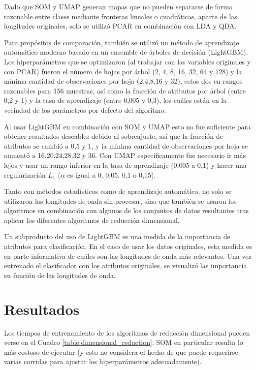 \documentclass[12pt]{article}
\begin{document}
Dado que SOM y UMAP generan mapas que no pueden separarse de forma razonable entre clases mediante fronteras lineales o cuadráticas, aparte de las longitudes originales, solo se utilizó PCAR en combinación con LDA y QDA.

Para propósitos de comparación, también se utilizó un método de aprendizaje automático moderno basado en un ensemble de árboles de decisión (LightGBM). Los hiperparámetros que se optimizaron (al trabajar con las variables originales y con PCAR) fueron el número de hojas por árbol (2, 4, 8, 16, 32, 64 y 128) y la mínima cantidad de observaciones por hoja (2,4,8,16 y 32), estos dos en rangos razonables para 156 muestras, así como la fracción de atributos por árbol (entre 0,2 y 1) y la tasa de aprendizaje (entre 0,005 y 0,3), los cuáles están en la vecindad de los parámetros por defecto del algoritmo. 

Al usar LightGBM en combinación con SOM y UMAP esto no fue suficiente para obtener resultados deseables debido al sobreajuste, así que la fracción de atributos se cambió a 0,5 y 1, y la mínima cantidad de observaciones por hoja se aumentó a 16,20,24,28,32 y 36. Con UMAP específicamente fue necesario ir más lejos y usar un rango inferior en la tasa de aprendizaje (0,005 a 0,1) y hacer una regularización $L_1$ ($\alpha$ es igual a 0, 0,05, 0,1 o 0,15). 

Tanto con métodos estadísticos como de aprendizaje automático, no solo se utilizaron las longitudes de onda sin procesar, sino que también se usaron los algoritmos en combinación con algunos de los conjuntos de datos resultantes tras aplicar los diferentes algoritmos de reducción dimensional.

Un subproducto del uso de LightGBM es una medida de la importancia de atributos para clasificación. En el caso de usar los datos originales, esta medida es en parte informativa de cuáles son las longitudes de onda más relevantes. Una vez entrenado el clasificador con los atributos originales, se visualizó las importancia en función de las longitudes de onda.

\section{Resultados}

Los tiempos de entrenamiento de los algoritmos de reducción dimensional pueden verse en el Cuadro \ref{table:dimensional_reduction}. SOM en particular resulta lo más costoso de ejecutar (y esto no considera el hecho de que puede requerirse varias corridas para ajustar los hiperparámetros adecuadamente).
\end{document}
